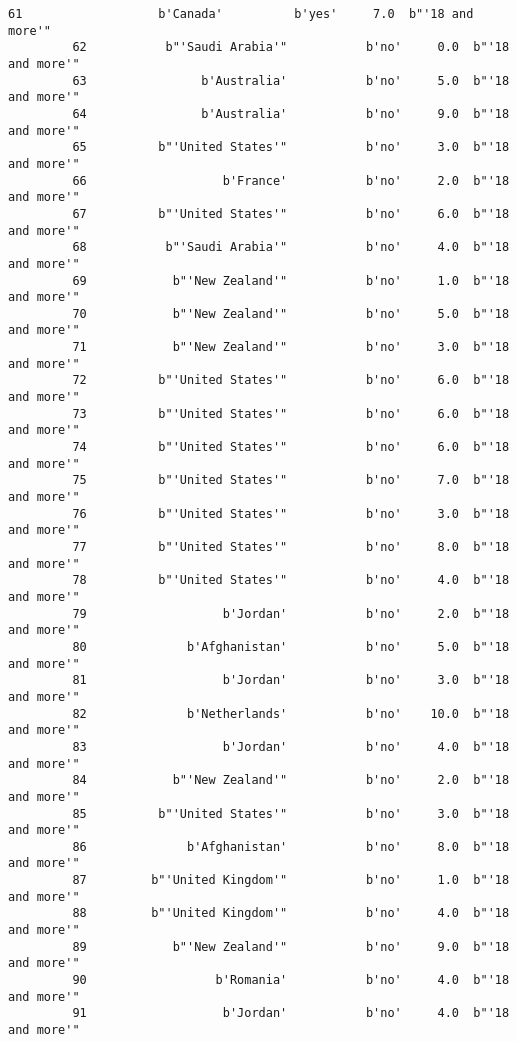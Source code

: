 \documentclass[11pt]{article}
\begin{document}
\begin{Verbatim}[commandchars=\\\{\}]
         61                   b'Canada'          b'yes'     7.0  b"'18 and more'"   
         62           b"'Saudi Arabia'"           b'no'     0.0  b"'18 and more'"   
         63                b'Australia'           b'no'     5.0  b"'18 and more'"   
         64                b'Australia'           b'no'     9.0  b"'18 and more'"   
         65          b"'United States'"           b'no'     3.0  b"'18 and more'"   
         66                   b'France'           b'no'     2.0  b"'18 and more'"   
         67          b"'United States'"           b'no'     6.0  b"'18 and more'"   
         68           b"'Saudi Arabia'"           b'no'     4.0  b"'18 and more'"   
         69            b"'New Zealand'"           b'no'     1.0  b"'18 and more'"   
         70            b"'New Zealand'"           b'no'     5.0  b"'18 and more'"   
         71            b"'New Zealand'"           b'no'     3.0  b"'18 and more'"   
         72          b"'United States'"           b'no'     6.0  b"'18 and more'"   
         73          b"'United States'"           b'no'     6.0  b"'18 and more'"   
         74          b"'United States'"           b'no'     6.0  b"'18 and more'"   
         75          b"'United States'"           b'no'     7.0  b"'18 and more'"   
         76          b"'United States'"           b'no'     3.0  b"'18 and more'"   
         77          b"'United States'"           b'no'     8.0  b"'18 and more'"   
         78          b"'United States'"           b'no'     4.0  b"'18 and more'"   
         79                   b'Jordan'           b'no'     2.0  b"'18 and more'"   
         80              b'Afghanistan'           b'no'     5.0  b"'18 and more'"   
         81                   b'Jordan'           b'no'     3.0  b"'18 and more'"   
         82              b'Netherlands'           b'no'    10.0  b"'18 and more'"   
         83                   b'Jordan'           b'no'     4.0  b"'18 and more'"   
         84            b"'New Zealand'"           b'no'     2.0  b"'18 and more'"   
         85          b"'United States'"           b'no'     3.0  b"'18 and more'"   
         86              b'Afghanistan'           b'no'     8.0  b"'18 and more'"   
         87         b"'United Kingdom'"           b'no'     1.0  b"'18 and more'"   
         88         b"'United Kingdom'"           b'no'     4.0  b"'18 and more'"   
         89            b"'New Zealand'"           b'no'     9.0  b"'18 and more'"   
         90                  b'Romania'           b'no'     4.0  b"'18 and more'"   
         91                   b'Jordan'           b'no'     4.0  b"'18 and more'"   

\end{Verbatim}
\end{document}

